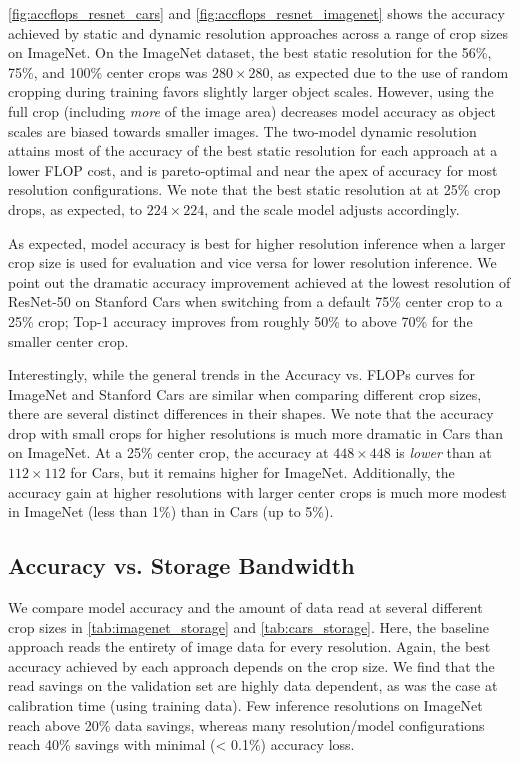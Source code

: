 \autoref{fig:accflops_resnet_cars} and \autoref{fig:accflops_resnet_imagenet} shows the accuracy achieved by static and dynamic resolution approaches across a range of crop sizes on ImageNet.
On the ImageNet dataset, the best static resolution for the 56\%, 75\%, and 100\% center crops was $280\times280$, as expected due to the use of random cropping during training favors slightly larger object scales.
However, using the full crop (including \emph{more} of the image area) decreases model accuracy as object scales are biased towards smaller images.
The two-model dynamic resolution attains most of the accuracy of the best static resolution for each approach at a lower FLOP cost, and is pareto-optimal and near the apex of accuracy for most resolution configurations.
We note that the best static resolution at at 25\% crop drops, as expected, to $224\times224$, and the scale model adjusts accordingly. 

As expected, model accuracy is best for higher resolution inference when a larger crop size is used for evaluation and vice versa for lower resolution inference.
We point out the dramatic accuracy improvement achieved at the lowest resolution of ResNet-50 on Stanford Cars when switching from a default 75\% center crop to a 25\% crop; Top-1 accuracy improves from roughly 50\% to above 70\% for the smaller center crop.

Interestingly, while the general trends in the Accuracy vs. FLOPs curves for ImageNet and Stanford Cars are similar when comparing different crop sizes, there are several distinct differences in their shapes.
We note that the accuracy drop with small crops for higher resolutions is much more dramatic in Cars than on ImageNet.
At a 25\% center crop, the accuracy at $448\times448$ is \emph{lower} than at $112\times112$ for Cars, but it remains higher for ImageNet. 
Additionally, the accuracy gain at higher resolutions with larger center crops is much more modest in ImageNet (less than 1\%) than in Cars (up to 5\%).


\subsection{Accuracy vs. Storage Bandwidth}
\label{sec:storage}
We compare model accuracy and the amount of data read at several different crop sizes in \autoref{tab:imagenet_storage} and \autoref{tab:cars_storage}.
Here, the baseline approach reads the entirety of image data for every resolution.
Again, the best accuracy achieved by each approach depends on the crop size.
We find that the read savings on the validation set are highly data dependent, as was the case at calibration time (using training data).
Few inference resolutions on ImageNet reach above 20\% data savings, whereas many resolution/model configurations reach 40\% savings with minimal (< 0.1\%) accuracy loss.


